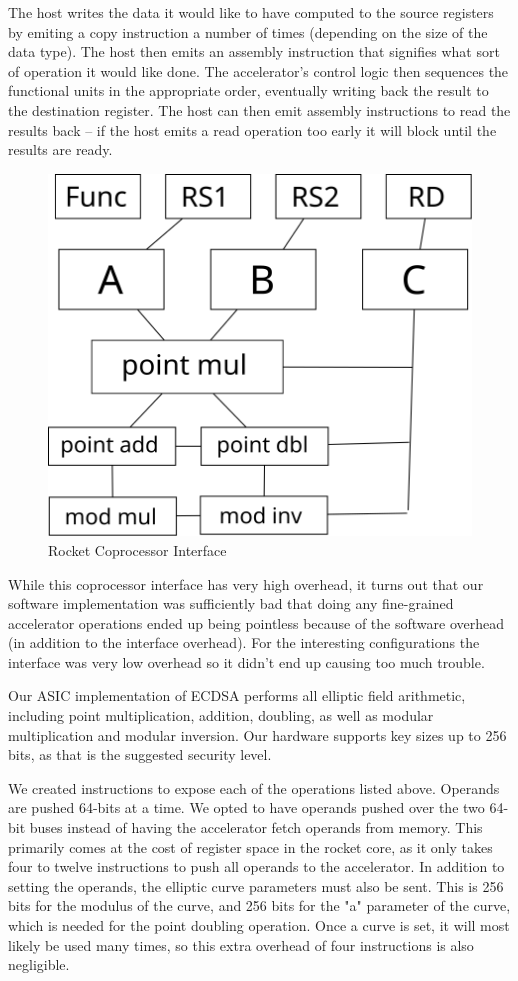 \documentclass[twocolumn]{article}
\begin{document}
The host writes the data it would like to have computed to the source
registers by emiting a copy instruction a number of times (depending
on the size of the data type).  The host then emits an assembly
instruction that signifies what sort of operation it would like done.
The accelerator's control logic then sequences the functional units in
the appropriate order, eventually writing back the result to the
destination register.  The host can then emit assembly instructions to
read the results back -- if the host emits a read operation too early
it will block until the results are ready.

\begin{figure}[t]
  \begin{center}
    \includegraphics[width=0.5\linewidth]{coproc.svg}
  \end{center}

  \caption{Rocket Coprocessor Interface
    \label{coproc}}
\end{figure}

While this coprocessor interface has very high overhead, it turns out
that our software implementation was sufficiently bad that doing any
fine-grained accelerator operations ended up being pointless because
of the software overhead (in addition to the interface overhead).  For
the interesting configurations the interface was very low overhead so
it didn't end up causing too much trouble.

Our ASIC implementation of ECDSA performs all elliptic field arithmetic,
including point multiplication, addition, doubling, as well as modular
multiplication and modular inversion. Our hardware supports key sizes
up to 256 bits, as that is the suggested security level.

We created instructions to expose each of the operations listed
above. Operands are pushed 64-bits at a time. We opted to have
operands pushed over the two 64-bit buses instead of having the
accelerator fetch operands from memory. This primarily comes at the
cost of register space in the rocket core, as it only takes
four to twelve instructions to push all operands to the
accelerator. In addition to setting the operands, the elliptic curve
parameters must also be sent. This is 256 bits for the modulus of the
curve, and 256 bits for the "a" parameter of the curve, which is
needed for the point doubling operation. Once a curve is set, it will
most likely be used many times, so this extra overhead of four
instructions is also negligible.
\end{document}
